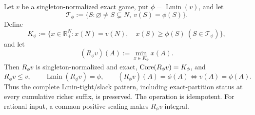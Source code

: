 \begin{theorem}
\label{thm:lx-tight-skeleton-retraction}
Let $v$ be a singleton-normalized exact game, put
$\phi=\operatorname{Lmin}(v)$, and let
\[
 \mathcal T_\phi:=\{S:\varnothing\ne S\subsetneq N,
                    \ v(S)=\phi(S)\}.
\]
Define
\[
 K_\phi:=\{x\in\mathbb R_+^N:x(N)=v(N),\quad
                 x(S)\geq\phi(S)\ (S\in\mathcal T_\phi)\},       \tag{SK-1}
 \label{eq:lx-tight-skeleton-polytope}
\]
and let
\[
 (R_\phi v)(A):=\min_{x\in K_\phi}x(A).                         \tag{SK-2}
 \label{eq:lx-tight-skeleton-game}
\]
Then $R_\phi v$ is singleton-normalized and exact,
$\operatorname{Core}(R_\phi v)=K_\phi$, and
\[
 R_\phi v\leq v,\qquad
 \operatorname{Lmin}(R_\phi v)=\phi,\qquad
 (R_\phi v)(A)=\phi(A)\Longleftrightarrow v(A)=\phi(A).          \tag{SK-3}
 \label{eq:lx-tight-skeleton-properties}
\]
Thus the complete Lmin-tight/slack pattern, including exact-partition
status at every cumulative richer suffix, is preserved.  The operation is
idempotent.  For rational input, a common positive scaling makes
$R_\phi v$ integral.
\end{theorem}

